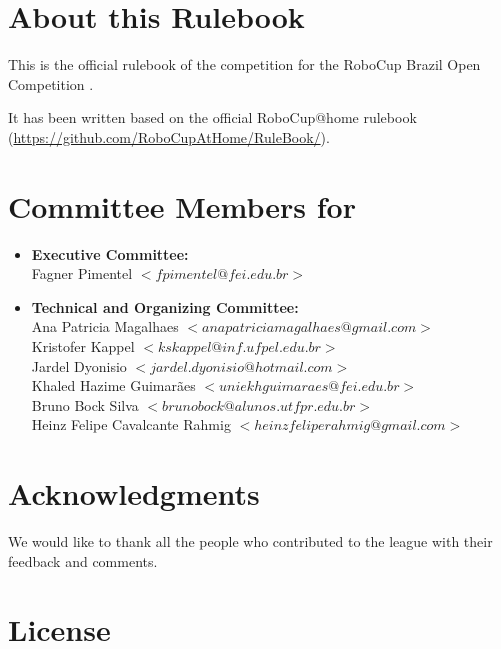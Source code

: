 

\section*{About this Rulebook}  
This is the official rulebook of the \AtHome{} competition for the RoboCup Brazil Open Competition \YEAR.

It has been written based on the official RoboCup@home rulebook (\url{https://github.com/RoboCupAtHome/RuleBook/}). 

\section*{Committee Members for \YEAR}
\begin{itemize}
    \item \textbf{Executive Committee:} \\ Fagner Pimentel $<fpimentel@fei.edu.br>$
    \item \textbf{Technical and Organizing Committee:} \\ 
    Ana Patricia Magalhaes $<anapatriciamagalhaes@gmail.com>$ \\
    Kristofer Kappel $<kskappel@inf.ufpel.edu.br>$ \\
    Jardel Dyonisio  $<jardel.dyonisio@hotmail.com>$ \\
    Khaled Hazime Guimarães $<uniekhguimaraes@fei.edu.br>$ \\
    Bruno Bock Silva $<brunobock@alunos.utfpr.edu.br>$ \\
    Heinz Felipe Cavalcante Rahmig $<heinzfeliperahmig@gmail.com>$
\end{itemize}

\section*{Acknowledgments}
\label{sec:acknowledgments}

We would like to thank all the people who contributed to the \AtHome{} league with their feedback and comments.

\vfill

\section*{License}

\doclicenseThis

